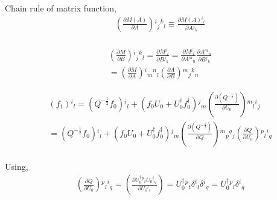 \begin{tcolorbox}

Chain rule of matrix function,
\begin{equation}
\begin{split}
&\left(\frac{\partial M (A)}{\partial A} \right){}^i{}_j{}^k{}_l \equiv \frac{\partial M (A) {}^i{}_l}{\partial A {}^j{}_k} \\
\end{split}
\end{equation}

\begin{equation}
\begin{split}
&\left(\frac{\partial M }{\partial B} \right){}^i{}_j{}^k{}_l =  \frac{\partial M {}^i{}_l}{\partial B {}^j{}_k} = \frac{\partial M {}^i{}_l}{\partial A {}^m{}_n} \frac{\partial A {}^m{}_n}{\partial B {}^j{}_k}\\
&=\left(\frac{\partial M}{\partial A} \right){}^i{}_m{}^n{}_l \left(\frac{\partial A}{\partial B} \right){}^m{}_j{}^k{}_n
\end{split}
\end{equation}

\end{tcolorbox}

\begin{equation}
\begin{split}
&(f_1){}^i{}_l=\left(Q^{-\frac{1}{2}}f_0\right){}^i{}_l+\left(f_0U_0+U_0^{\dagger}f_0^{\dagger}\right) {}^j{}_m \left(\frac{\partial \left(Q^{-\frac{1}{2}}\right)}{\partial U_0 }\right){}^m{}_l{}^i{}_j \\
&=\left(Q^{-\frac{1}{2}}f_0\right){}^i{}_l+\left(f_0U_0+U_0^{\dagger}f_0^{\dagger}\right) {}^j{}_m \left(\frac{\partial \left(Q^{-\frac{1}{2}}\right)}{\partial Q }\right){}^m{}_p{}^q{}_j \left(\frac{\partial Q}{\partial U_0 }\right){}^p{}_l{}^i{}_q \\
\end{split}
\end{equation}

Using,
\begin{equation}
\begin{split}
&\left(\frac{\partial Q}{\partial U_0}\right){}^p{}_l{}^i{}_q=\left(\frac{\partial U_0^{\dagger}{}^p{}_t U_0{}^t{}_q}{\partial U_0{}^l{}_i}\right)=U_0^{\dagger}{}^p{}_t \delta {}^t{}_l \delta {}^i{}_q=U_0^{\dagger}{}^p{}_l \delta {}^i{}_q\\
\end{split}
\end{equation}


